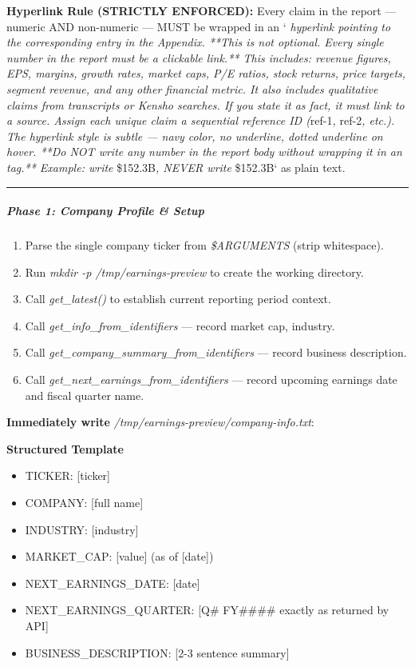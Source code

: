\documentclass[11pt]{article}
\begin{document}
\textbf{Hyperlink Rule (STRICTLY ENFORCED):} Every claim in the report — numeric AND non-numeric — MUST be wrapped in an `\emph{ hyperlink pointing to the corresponding entry in the Appendix. **This is not optional. Every single number in the report must be a clickable link.** This includes: revenue figures, EPS, margins, growth rates, market caps, P/E ratios, stock returns, price targets, segment revenue, and any other financial metric. It also includes qualitative claims from transcripts or Kensho searches. If you state it as fact, it must link to a source. Assign each unique claim a sequential reference ID (}ref-1\emph{, }ref-2\emph{, etc.). The hyperlink style is subtle — navy color, no underline, dotted underline on hover. **Do NOT write any number in the report body without wrapping it in an }\emph{ tag.** Example: write }\$152.3B\emph{, NEVER write }\$152.3B` as plain text.


\vspace{0.5em}\hrule\vspace{0.5em}

\subparagraph{Phase 1: Company Profile \& Setup}\mbox{}\par

\begin{enumerate}[leftmargin=*,itemsep=2pt,topsep=2pt]
\item {} Parse the single company ticker from \emph{\$ARGUMENTS} (strip whitespace).
\item {} Run \emph{mkdir -p /tmp/earnings-preview} to create the working directory.
\item {} Call \emph{get\_\allowbreak{}latest()} to establish current reporting period context.
\item {} Call \emph{get\_\allowbreak{}info\_\allowbreak{}from\_\allowbreak{}identifiers} — record market cap, industry.
\item {} Call \emph{get\_\allowbreak{}company\_\allowbreak{}summary\_\allowbreak{}from\_\allowbreak{}identifiers} — record business description.
\item {} Call \emph{get\_\allowbreak{}next\_\allowbreak{}earnings\_\allowbreak{}from\_\allowbreak{}identifiers} — record upcoming earnings date and fiscal quarter name.
\end{enumerate}

\textbf{Immediately write} \emph{/tmp/earnings-preview/company-info.txt}:

\textbf{Structured Template}
\begin{itemize}[leftmargin=*,itemsep=2pt,topsep=2pt]
\item {} TICKER: [ticker]
\item {} COMPANY: [full name]
\item {} INDUSTRY: [industry]
\item {} MARKET\_\allowbreak{}CAP: [value] (as of [date])
\item {} NEXT\_\allowbreak{}EARNINGS\_\allowbreak{}DATE: [date]
\item {} NEXT\_\allowbreak{}EARNINGS\_\allowbreak{}QUARTER: [Q\# FY\#\#\#\# exactly as returned by API]
\item {} BUSINESS\_\allowbreak{}DESCRIPTION: [2-3 sentence summary]
\end{itemize}
\end{document}

